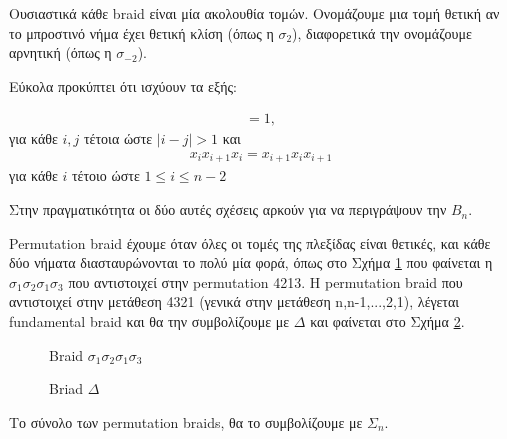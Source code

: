Ουσιαστικά κάθε braid είναι μία ακολουθία τομών. Ονομάζουμε μια τομή θετική αν το μπροστινό νήμα έχει θετική κλίση (όπως η $\sigma_{2}$), διαφορετικά την ονομάζουμε αρνητική (όπως η $\sigma_{-2}$). 

Εύκολα προκύπτει ότι ισχύουν τα εξής:

\begin{align*}
[\sigma_i,\sigma_j]=1, 
\end{align*}
για κάθε $ i,j $ τέτοια ώστε $ \mid i-j \mid>1 $
και
\begin{align*}
x_i x_{i+1} x_i=x_{i+1}x_ix_{i+1} 
\end{align*}
για κάθε $ i $ τέτοιο ώστε $ 1 \leq i \leq n-2 $

Στην πραγματικότητα οι δύο αυτές σχέσεις αρκούν για να περιγράψουν την $ B_n $.

Permutation braid έχουμε όταν όλες οι τομές της πλεξίδας είναι θετικές, και κάθε δύο νήματα διασταυρώνονται το πολύ μία φορά, όπως στο Σχήμα \ref{bedet} που φαίνεται η $\sigma_{1}\sigma_{2}\sigma_{1}\sigma_{3}$ που αντιστοιχεί στην permutation 4213. H permutation braid που αντιστοιχεί στην μετάθεση 4321 (γενικά στην μετάθεση n,n-1,...,2,1), λέγεται fundamental braid και θα την συμβολίζουμε με $\Delta$ και φαίνεται στο Σχήμα \ref{delta}.
\begin{figure}[h]
\caption{Braid $ \sigma_1\sigma_2\sigma_1\sigma_3 $}
\label{bedet}
\end{figure}

\begin{figure}[h]
\caption{Briad $ \Delta $}
\label{delta}
\end{figure}
Το σύνολο των permutation braids, θα το συμβολίζουμε με $\Sigma_{n}$. 

